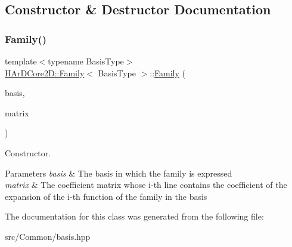 \subsection{Constructor \& Destructor Documentation}
\mbox{\label{classHArDCore2D_1_1Family_a2e8f09ecc2cfd226ebb6539b34934d6a}} 
\subsubsection{\texorpdfstring{Family()}{Family()}}
{\footnotesize\ttfamily template$<$typename Basis\+Type$>$ \\
\hyperlink{classHArDCore2D_1_1Family}{H\+Ar\+D\+Core2\+D\+::\+Family}$<$ Basis\+Type $>$\+::\hyperlink{classHArDCore2D_1_1Family}{Family} (\begin{DoxyParamCaption}\item[{const Basis\+Type \&}]{basis,  }\item[{const Eigen\+::\+Matrix\+Xd \&}]{matrix }\end{DoxyParamCaption})\hspace{0.3cm}{\ttfamily [inline]}}



Constructor. 


\begin{DoxyParams}{Parameters}
{\em basis} & The basis in which the family is expressed \\
\hline
{\em matrix} & The coefficient matrix whose i-\/th line contains the coefficient of the expansion of the i-\/th function of the family in the basis \\
\hline
\end{DoxyParams}


The documentation for this class was generated from the following file\+:\begin{DoxyCompactItemize}
\item 
src/\+Common/basis.\+hpp\end{DoxyCompactItemize}
